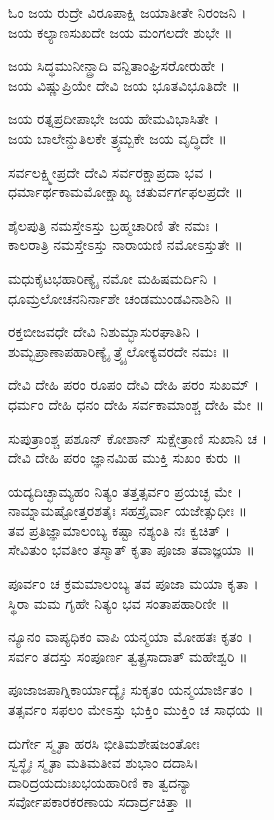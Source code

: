 ಓಂ ಜಯ ರುದ್ರೇ ವಿರೂಪಾಕ್ಷಿ ಜಯಾತೀತೇ ನಿರಂಜನಿ ।\\ಜಯ ಕಲ್ಯಾಣಸುಖದೇ ಜಯ ಮಂಗಲದೇ ಶುಭೇ ॥

ಜಯ ಸಿದ್ಧಮುನೀನ್ದ್ರಾದಿ ವನ್ದಿತಾಂಘ್ರಿಸರೋರುಹೇ ।\\ಜಯ ವಿಷ್ಣುಪ್ರಿಯೇ ದೇವಿ ಜಯ ಭೂತವಿಭೂತಿದೇ ॥

ಜಯ ರತ್ನಪ್ರದೀಪಾಭೇ ಜಯ ಹೇಮವಿಭಾಸಿತೇ ।\\ಜಯ ಬಾಲೇನ್ದುತಿಲಕೇ ತ್ರ್ಯಮ್ಬಕೇ ಜಯ ವೃದ್ಧಿದೇ ॥

ಸರ್ವಲಕ್ಷ್ಮೀಪ್ರದೇ ದೇವಿ ಸರ್ವರಕ್ಷಾಪ್ರದಾ ಭವ ।\\ಧರ್ಮಾರ್ಥಕಾಮಮೋಕ್ಷಾಖ್ಯ ಚತುರ್ವರ್ಗಫಲಪ್ರದೇ ॥

ಶೈಲಪುತ್ರಿ ನಮಸ್ತೇಽಸ್ತು ಬ್ರಹ್ಮಚಾರಿಣಿ ತೇ ನಮಃ ।\\ಕಾಲರಾತ್ರಿ ನಮಸ್ತೇಽಸ್ತು ನಾರಾಯಣಿ ನಮೋಽಸ್ತುತೇ ॥

ಮಧುಕೈಟಭಹಾರಿಣ್ಯೈ ನಮೋ ಮಹಿಷಮರ್ದಿನಿ ।\\ಧೂಮ್ರಲೋಚನನಿರ್ನಾಶೇ ಚಂಡಮುಂಡವಿನಾಶಿನಿ ॥

ರಕ್ತಬೀಜವಧೇ ದೇವಿ ನಿಶುಮ್ಭಾಸುರಘಾತಿನಿ ।\\ಶುಮ್ಭಪ್ರಾಣಾಪಹಾರಿಣ್ಯೈ ತ್ರ್ಯೈಲೋಕ್ಯವರದೇ ನಮಃ ॥

ದೇವಿ ದೇಹಿ ಪರಂ ರೂಪಂ ದೇವಿ ದೇಹಿ ಪರಂ ಸುಖಮ್ ।\\ಧರ್ಮಂ ದೇಹಿ ಧನಂ ದೇಹಿ ಸರ್ವಕಾಮಾಂಶ್ಚ ದೇಹಿ ಮೇ ॥

ಸುಪುತ್ರಾಂಶ್ಚ ಪಶೂನ್ ಕೋಶಾನ್ ಸುಕ್ಷೇತ್ರಾಣಿ ಸುಖಾನಿ ಚ ।\\ದೇವಿ ದೇಹಿ ಪರಂ ಜ್ಞಾನಮಿಹ ಮುಕ್ತಿ ಸುಖಂ ಕುರು ॥

ಯದ್ಯದಿಚ್ಛಾಮ್ಯಹಂ ನಿತ್ಯಂ ತತ್ತತ್ಸರ್ವಂ ಪ್ರಯಚ್ಛ ಮೇ ।\\ನಾಮ್ನಾಮಷ್ಟೋತ್ತರಶತೈಃ ಸಹಸ್ರೈರ್ವಾ ಯಜೇತ್ಸುಧೀಃ ॥\\

ತವ ಪ್ರತಿಜ್ಞಾಮಾಲಂಬ್ಯ ಕಷ್ಟಾ ನಶ್ಯಂತಿ ನಃ ಕ್ವಚಿತ್ ।\\ಸೇವಿತುಂ ಭವತೀಂ ತಸ್ಮಾತ್ ಕೃತಾ ಪೂಜಾ ತವಾಜ್ಞಯಾ ॥

ಪೂರ್ವಂ ಚ ಕ್ರಮಮಾಲಂಬ್ಯ ತವ ಪೂಜಾ ಮಯಾ ಕೃತಾ ।\\ಸ್ಥಿರಾ ಮಮ ಗೃಹೇ ನಿತ್ಯಂ ಭವ ಸಂತಾಪಹಾರಿಣೀ ॥
 
ನ್ಯೂನಂ ವಾಪ್ಯಧಿಕಂ ವಾಪಿ ಯನ್ಮಯಾ ಮೋಹತಃ ಕೃತಂ ।\\ಸರ್ವಂ ತದಸ್ತು ಸಂಪೂರ್ಣ ತ್ವತ್ಪ್ರಸಾದಾತ್ ಮಹೇಶ್ವರಿ ॥

ಪೂಜಾಜಪಾಗ್ನಿಕಾರ್ಯಾದ್ಯೈಃ ಸುಕೃತಂ ಯನ್ಮಯಾರ್ಜಿತಂ ।\\ತತ್ಸರ್ವಂ ಸಫಲಂ ಮೇಽಸ್ತು ಭುಕ್ತಿಂ ಮುಕ್ತಿಂ ಚ ಸಾಧಯ ॥

ದುರ್ಗೇ ಸ್ಮೃತಾ ಹರಸಿ ಭೀತಿಮಶೇಷಜಂತೋಃ\\ಸ್ವಸ್ಥೈಃ ಸ್ಮೃತಾ ಮತಿಮತೀವ ಶುಭಾಂ ದದಾಸಿ।\\
ದಾರಿದ್ರಯದುಃಖಭಯಹಾರಿಣಿ ಕಾ ತ್ವದನ್ಯಾ\\ಸರ್ವೋಪಕಾರಕರಣಾಯ ಸದಾರ್ದ್ರಚಿತ್ತಾ ॥

